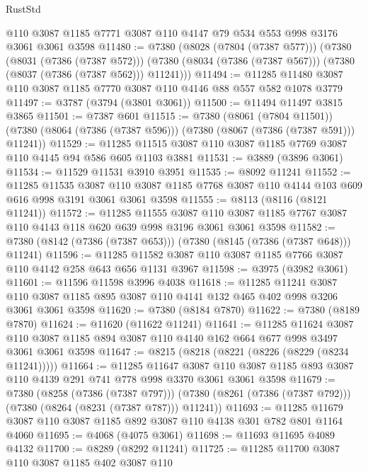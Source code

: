 \begin{lexlean}{RustStd}
\begin{coremodule}
    @110
    @3087
    @1185
    @7771
    @3087
    @110
    @4147
    @79
    @534
    @553
    @998
    @3176
    @3061
    @3061
    @3598
@11480 := @7380
    (@8028 (@7804 (@7387 @577)))
    (@7380
      (@8031 (@7386 (@7387 @572)))
      (@7380 (@8034 (@7386 (@7387 @567))) (@7380 (@8037 (@7386 (@7387 @562))) @11241)))
@11494 := @11285 @11480 @3087 @110 @3087 @1185 @7770 @3087 @110 @4146 @88 @557 @582 @1078 @3779
@11497 := @3787 (@3794 (@3801 @3061))
@11500 := @11494 @11497 @3815 @3865
@11501 := @7387 @601
@11515 := @7380
    (@8061 (@7804 @11501))
    (@7380 (@8064 (@7386 (@7387 @596))) (@7380 (@8067 (@7386 (@7387 @591))) @11241))
@11529 := @11285 @11515 @3087 @110 @3087 @1185 @7769 @3087 @110 @4145 @94 @586 @605 @1103 @3881
@11531 := @3889 (@3896 @3061)
@11534 := @11529 @11531 @3910 @3951
@11535 := @8092 @11241
@11552 := @11285
    @11535
    @3087
    @110
    @3087
    @1185
    @7768
    @3087
    @110
    @4144
    @103
    @609
    @616
    @998
    @3191
    @3061
    @3061
    @3598
@11555 := @8113 (@8116 (@8121 @11241))
@11572 := @11285
    @11555
    @3087
    @110
    @3087
    @1185
    @7767
    @3087
    @110
    @4143
    @118
    @620
    @639
    @998
    @3196
    @3061
    @3061
    @3598
@11582 := @7380 (@8142 (@7386 (@7387 @653))) (@7380 (@8145 (@7386 (@7387 @648))) @11241)
@11596 := @11285 @11582 @3087 @110 @3087 @1185 @7766 @3087 @110 @4142 @258 @643 @656 @1131 @3967
@11598 := @3975 (@3982 @3061)
@11601 := @11596 @11598 @3996 @4038
@11618 := @11285
    @11241
    @3087
    @110
    @3087
    @1185
    @895
    @3087
    @110
    @4141
    @132
    @465
    @402
    @998
    @3206
    @3061
    @3061
    @3598
@11620 := @7380 (@8184 @7870)
@11622 := @7380 (@8189 @7870)
@11624 := @11620 (@11622 @11241)
@11641 := @11285
    @11624
    @3087
    @110
    @3087
    @1185
    @894
    @3087
    @110
    @4140
    @162
    @664
    @677
    @998
    @3497
    @3061
    @3061
    @3598
@11647 := @8215 (@8218 (@8221 (@8226 (@8229 (@8234 @11241)))))
@11664 := @11285
    @11647
    @3087
    @110
    @3087
    @1185
    @893
    @3087
    @110
    @4139
    @291
    @741
    @778
    @998
    @3370
    @3061
    @3061
    @3598
@11679 := @7380
    (@8258 (@7386 (@7387 @797)))
    (@7380 (@8261 (@7386 (@7387 @792))) (@7380 (@8264 (@8231 (@7387 @787))) @11241))
@11693 := @11285 @11679 @3087 @110 @3087 @1185 @892 @3087 @110 @4138 @301 @782 @801 @1164 @4060
@11695 := @4068 (@4075 @3061)
@11698 := @11693 @11695 @4089 @4132
@11700 := @8289 (@8292 @11241)
@11725 := @11285
    @11700
    @3087
    @110
    @3087
    @1185
    @402
    @3087
    @110

\end{coremodule}
\end{lexlean}
